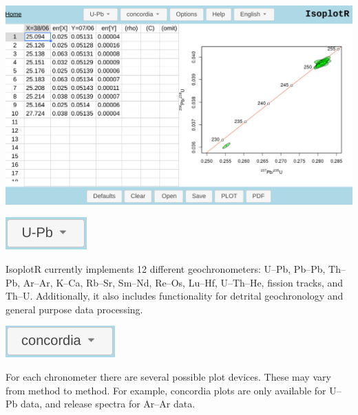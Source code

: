 \begin{refsection}
\noindent\includegraphics[width=\textwidth]{../figures/IsoplotR.png}\\

\noindent\begin{minipage}[t]{.15\textwidth}
\strut\vspace*{-\baselineskip}\newline
  \includegraphics[width=.7\linewidth]{../figures/chronometerbutton.png}
\end{minipage}
\begin{minipage}[t]{.85\textwidth}
IsoplotR currently implements 12 different geochronometers: U--Pb,
Pb--Pb, Th--Pb, Ar--Ar, K--Ca, Rb--Sr, Sm--Nd, Re--Os, Lu--Hf,
U--Th--He, fission tracks, and Th--U.  Additionally, it also includes
functionality for detrital geochronology and general purpose data
processing.\\
\end{minipage}

\noindent\begin{minipage}[t]{.15\textwidth}
\strut\vspace*{-\baselineskip}\newline
\includegraphics[width=\textwidth]{../figures/plotdevices.png}
\end{minipage}
\begin{minipage}[t]{.85\textwidth}
For each chronometer there are several possible plot devices.  These
may vary from method to method. For example, concordia plots are only
available for U--Pb data, and release spectra for Ar--Ar data.\\
\end{minipage}


\end{refsection}
